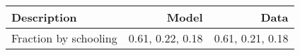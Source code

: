 \begin{tabular}{lrr}
\hline
Description & Model  & Data  \\
\hline
Fraction by schooling & 0.61, 0.22, 0.18  & 0.61, 0.21, 0.18  \\
\hline
\end{tabular}%
